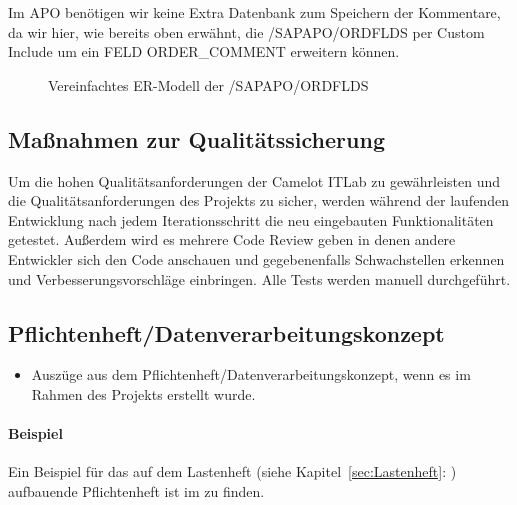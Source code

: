 Im APO benötigen wir keine Extra Datenbank zum Speichern der Kommentare, da wir hier, wie bereits oben erwähnt, die /SAPAPO/ORDFLDS per Custom Include um ein FELD ORDER\_COMMENT erweitern können.  

\begin{figure}[htb]
	\centering
	\caption{Vereinfachtes ER-Modell der /SAPAPO/ORDFLDS}
	\label{fig:APO01}
\end{figure} 

\subsection{Maßnahmen zur Qualitätssicherung}
\label{sec:Qualitaetssicherung}
Um die hohen Qualitätsanforderungen der Camelot ITLab zu gewährleisten und die Qualitätsanforderungen des Projekts zu sicher, werden während der laufenden Entwicklung nach jedem Iterationsschritt die neu eingebauten Funktionalitäten getestet. Außerdem wird es mehrere Code Review geben in denen andere Entwickler sich den Code anschauen und gegebenenfalls Schwachstellen erkennen und Verbesserungsvorschläge einbringen. Alle Tests werden manuell durchgeführt.  


\subsection{Pflichtenheft/Datenverarbeitungskonzept}
\label{sec:Pflichtenheft}
\begin{itemize}
	\item Auszüge aus dem Pflichtenheft/Datenverarbeitungskonzept, wenn es im Rahmen des Projekts erstellt wurde.
\end{itemize}

\paragraph{Beispiel}
Ein Beispiel für das auf dem Lastenheft (siehe Kapitel~\ref{sec:Lastenheft}: ) aufbauende Pflichtenheft ist im  zu finden.


